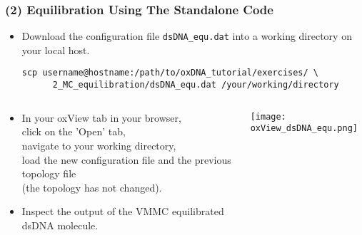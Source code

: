 \documentclass[slidestop,compress,9pt]{beamer}
\begin{document}
\begin{frame}[fragile]
\frametitle{(2) Equilibration Using The Standalone Code}

\begin{itemize}
\item Download the configuration file \texttt{dsDNA\_equ.dat} into a working directory on your local host.
\begin{lstlisting}
scp username@hostname:/path/to/oxDNA_tutorial/exercises/ \
      2_MC_equilibration/dsDNA_equ.dat /your/working/directory
\end{lstlisting}
\end{itemize}

\begin{columns}

\begin{column}{0.48\textwidth}

\begin{itemize}
\setlength\itemsep{15pt}
\item In your oxView tab in your browser,\\
click on the 'Open' tab,\\
navigate to your working directory,
\\load the new configuration file and the previous topology file\\
(the topology has not changed).

\item Inspect the output of the VMMC equilibrated dsDNA molecule.
\end{itemize}
\end{column}

\begin{column}{0.48\textwidth}

\texttt{[image: oxView\_dsDNA\_equ.png]}

\end{column}
\end{columns}

\end{frame}
\end{document}

